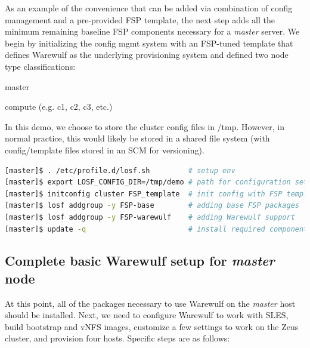 \documentclass[letterpaper]{article}
\begin{document}
As an example of the convenience that can be added via combination of config
management and a pre-provided FSP template, the next step adds all the minimum
remaining baseline FSP components necessary for a {\em master} server. We begin
by initializing the config mgmt system with an FSP-tuned template that defines
Warewulf as the underlying provisioning system and defined two node type
classifications:
\begin{itemize*}
\item master
\item compute (e.g. c1, c2, c3, etc.)
\end{itemize*}
In this demo, we choose to store the cluster config files in /tmp. However, in
normal practice, this would likely be stored in a shared file system (with
config/template files stored in an SCM for versioning).

\vspace*{0.2cm}


\begin{lstlisting}[language=bash,keywords={}]
[master]$ . /etc/profile.d/losf.sh         # setup env
[master]$ export LOSF_CONFIG_DIR=/tmp/demo # path for configuration setup
[master]$ initconfig cluster FSP_template  # init config with FSP template
[master]$ losf addgroup -y FSP-base        # adding base FSP packages
[master]$ losf addgroup -y FSP-warewulf    # adding Warewulf support
[master]$ update -q                        # install required components
\end{lstlisting}


\subsection{Complete basic Warewulf setup for {\em master} node}

At this point, all of the packages necessary to use Warewulf on the {\em
  master} host should be installed.  Next, we need to configure Warewulf to
work with SLES, build bootstrap and vNFS images, customize a few settings to
work on the Zeus cluster, and provision four hosts. Specific steps are as
follows:
\end{document}
